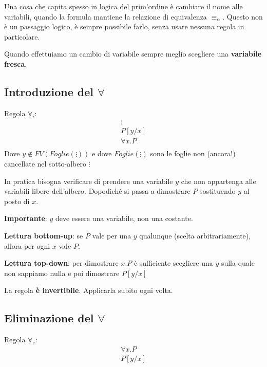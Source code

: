 \documentclass[
  a4paper,
]{article}
\begin{document}
Una cosa che capita spesso in logica del prim'ordine è cambiare il nome
alle variabili, quando la formula mantiene la relazione di equivalenza
\(\equiv_\alpha\). Questo non è un passaggio logico, è sempre possibile
farlo, senza usare nessuna regola in particolare.

Quando effettuiamo un cambio di variabile sempre meglio scegliere una
\textbf{variabile fresca}.

\hypertarget{introduzione-del-forall}{%
\subsection{\texorpdfstring{Introduzione del
\(\forall\)}{Introduzione del \textbackslash forall}}\label{introduzione-del-forall}}

Regola \(\forall_i\): \[
\begin{matrix} 
\vdots \\
P[y/x] \\
\hline 
\forall x. P \\
\end{matrix}
\] Dove \(y \not \in FV(Foglie(\vdots))\) e dove \(Foglie(\vdots)\) sono
le foglie non (ancora!) cancellate nel sotto-albero \(\vdots\)

In pratica bisogna verificare di prendere una variabile \(y\) che non
appartenga alle variabili libere dell'albero. Dopodiché si passa a
dimostrare \(P\) sostituendo \(y\) al posto di \(x\).

\textbf{Importante}: \(y\) deve essere una variabile, non una costante.

\textbf{Lettura bottom-up}: se \(P\) vale per una \(y\) qualunque
(scelta arbitrariamente), allora per ogni \(x\) vale \(P\).

\textbf{Lettura top-down}: per dimostrare \(x.P\) è sufficiente
scegliere una \(y\) sulla quale non sappiamo nulla e poi dimostrare
\(P[y/x]\)

La regola \textbf{è invertibile}. Applicarla subito ogni volta.

\hypertarget{eliminazione-del-forall}{%
\subsection{\texorpdfstring{Eliminazione del
\(\forall\)}{Eliminazione del \textbackslash forall}}\label{eliminazione-del-forall}}

Regola \(\forall_e\): \[
\begin{matrix} 
\forall x. P \\
\hline 
P[y/x] \\
\end{matrix}
\]
\end{document}
